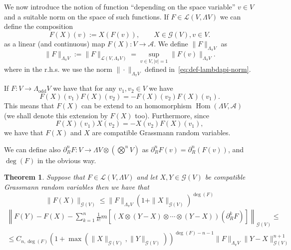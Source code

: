 \documentclass{article}
\newcommand{\assign}{:=}
\newcommand{\tmop}[1]{\ensuremath{\operatorname{#1}}}
\newtheorem{theorem}{Theorem}
\begin{document}
We now introduce the notion of function ``depending on the space variable'' $v
\in V$ and a suitable norm on the space of such functions. If $F \in
\mathcal{L} (V, \Lambda V)$ we can define the composition
\[ F (X) (v) \assign X (F (v)), \qquad X \in \mathcal{G} (V), v \in V. \]
as a linear (and continuous) map $F (X) : V \rightarrow \mathcal{A}$. We
define $\| F \|_{\Lambda_{\pi} V\mathcal{}}$ as
\begin{equation}
  \| F \|_{\Lambda_{\pi} V\mathcal{}} \assign \| F \|_{\mathcal{L} (V,
  \Lambda_{\pi} V)} = \sup_{v \in V, | v | = 1} \| F (v) \|_{\Lambda_{\pi} V}
  . \label{eq:normfunction}
\end{equation}
where in the r.h.s. we use the norm $\| \cdot \|_{\Lambda_{\pi} V}$ defined
in~{\eqref{eq:def-lambdapi-norm}}.

\begin{remark}
  If $F : V \rightarrow \Lambda_{\tmop{odd}} V$ we have that for any $v_1, v_2
  \in V$ we have
  \[ F (X) (v_1) F (X) (v_2) = - F (X) (v_2) F (X) (v_1) . \]
  This means that $F (X)$ can be extend to an homomorphism $\tmop{Hom}
  (\Lambda V, \mathcal{A})$ (we shall denote this extension by $F (X)$ too).
  Furthermore, since
  \[ F (X) (v_1) X (v_2) = - X (v_2) F (X) (v_1), \]
  we have that $F (X)$ and $X$ are compatible Grassmann random variables.
\end{remark}

We can define also $\partial_R^n F : V \rightarrow \Lambda V \otimes \left(
\bigotimes^n V \right)$ as $\partial_R^n F (v) = \partial^n_R (F (v))$, and
$\deg (F)$ in the obvious way.

\begin{theorem}
  \label{theorem_function2}Suppose that $F \in \mathcal{L} (V, \Lambda V)$ and
  let $X, Y \in \mathcal{G} (V)$ be compatible Grassmann random variables then
  we have that
  \[ \| F (X) \|_{\mathcal{G} (V)} \leqslant \| F \|_{\Lambda_{\pi} V} (1 +
     \| X \|_{\mathcal{G} (V)})^{\deg (F)} \]
  \[ \begin{array}{c}
       \left\| F (Y) - F (X) - \sum_{k = 1}^n \frac{1}{k!} m [(X \otimes (Y -
       X) \otimes \cdots \otimes (Y - X)) (\partial_R^k F)]
       \right\|_{\mathcal{G} (V)} \leqslant\\
       \leqslant C_{n, \deg (F)} (1 + \max (\| X \|_{\mathcal{G} (V)}, \| Y
       \|_{\mathcal{G} (V)}))^{\deg (F) - n - 1} \| F \|_{\Lambda_{\pi} V} \|
       Y - X \|_{\mathcal{G} (V)}^{n + 1}
     \end{array} \]
\end{theorem}
\end{document}
